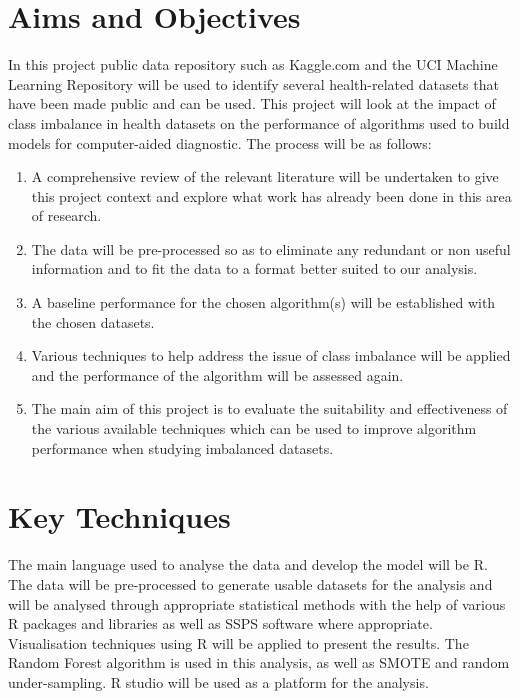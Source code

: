 \section{Aims and Objectives}
In this project public data repository such as Kaggle.com and the UCI Machine Learning Repository will be used to identify several health-related datasets that have been made public and can be used. This project will look at the impact of class imbalance in health datasets on the performance of algorithms used to build models for computer-aided diagnostic. The process will be as follows:
\begin{enumerate}
    \item A comprehensive review of the relevant literature will be undertaken to give this project context and explore what work has already been done in this area of research.
    
    \item The data will be pre-processed so as to eliminate any redundant or non useful information and to fit the data to a format better suited to our analysis.
    
    \item A baseline performance for the chosen algorithm(s) will be established with the chosen datasets.
    
    \item Various techniques to help address the issue of class imbalance will be applied and the performance of the algorithm will be assessed again.
    
    \item The main aim of this project is to evaluate the suitability and effectiveness of the various available techniques which can be used to improve algorithm performance when studying imbalanced datasets.
  
\end{enumerate}

\section{Key Techniques}
The main language used to analyse the data and develop the model will be R.
The data will be pre-processed to generate usable datasets for the analysis and will be analysed through appropriate statistical methods with the help of various R packages and libraries as well as SSPS software where appropriate.\newline
Visualisation techniques using R will be applied to present the results. The Random Forest algorithm is used in this analysis, as well as SMOTE and random under-sampling. \newline
R studio will be used as a platform for the analysis.\newline

